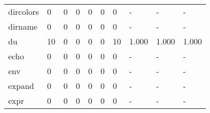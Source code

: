 \begin{longtable}{lp{2.0cm}p{2.0cm}p{2.0cm}p{2.0cm}p{2.0cm}p{2.0cm}p{2.0cm}p{2.0cm}p{2.0cm}}
dircolors &                      0 &                                  0 &                                 0 &                                0 &                                 0 &                               0 &                                    - &                                      - &                                    - \\
dirname   &                      0 &                                  0 &                                 0 &                                0 &                                 0 &                               0 &                                    - &                                      - &                                    - \\
du        &                     10 &                                  0 &                                 0 &                                0 &                                 0 &                              10 &                                1.000 &                                  1.000 &                                1.000 \\
echo      &                      0 &                                  0 &                                 0 &                                0 &                                 0 &                               0 &                                    - &                                      - &                                    - \\
env       &                      0 &                                  0 &                                 0 &                                0 &                                 0 &                               0 &                                    - &                                      - &                                    - \\
expand    &                      0 &                                  0 &                                 0 &                                0 &                                 0 &                               0 &                                    - &                                      - &                                    - \\
expr      &                      0 &                                  0 &                                 0 &                                0 &                                 0 &                               0 &                                    - &                                      - &                                    - \\

\end{longtable}
